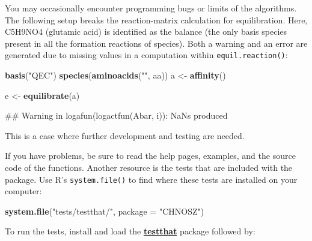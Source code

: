 \documentclass[]{tufte-book}
\newenvironment{Shaded}{}{}
\newcommand{\KeywordTok}[1]{\textcolor[rgb]{0.00,0.44,0.13}{\textbf{#1}}}
\newcommand{\DataTypeTok}[1]{\textcolor[rgb]{0.56,0.13,0.00}{#1}}
\newcommand{\StringTok}[1]{\textcolor[rgb]{0.25,0.44,0.63}{#1}}
\newcommand{\NormalTok}[1]{#1}
\begin{document}
You may occasionally encounter programming bugs or limits of the
algorithms. The following setup breaks the reaction-matrix calculation
for equilibration. Here, C5H9NO4 (glutamic acid) is identified as the
balance (the only basis species present in all the formation reactions
of species). Both a warning and an error are generated due to missing
values in a computation within {\texttt{equil.reaction()}}:

\begin{Shaded}
\begin{Highlighting}[]
\KeywordTok{basis}\NormalTok{(}\StringTok{"QEC"}\NormalTok{)}
\KeywordTok{species}\NormalTok{(}\KeywordTok{aminoacids}\NormalTok{(}\StringTok{""}\NormalTok{, aa))}
\NormalTok{a <-}\StringTok{ }\KeywordTok{affinity}\NormalTok{()}
\end{Highlighting}
\end{Shaded}

\begin{Shaded}
\begin{Highlighting}[]
\NormalTok{e <-}\StringTok{ }\KeywordTok{equilibrate}\NormalTok{(a)}
\end{Highlighting}
\end{Shaded}

\begin{Shaded}
\begin{Highlighting}[]
\NormalTok{## Warning in logafun(logactfun(Abar, i)): NaNs produced}
\end{Highlighting}
\end{Shaded}

This is a case where further development and testing are needed.

If you have problems, be sure to read the help pages, examples, and the
source code of the functions. Another resource is the tests that are
included with the package. Use R's \texttt{system.file()} to find where
these tests are installed on your computer:

\begin{Shaded}
\begin{Highlighting}[]
\KeywordTok{system.file}\NormalTok{(}\StringTok{"tests/testthat/"}\NormalTok{, }\DataTypeTok{package =} \StringTok{"CHNOSZ"}\NormalTok{)}
\end{Highlighting}
\end{Shaded}

To run the tests, install and load the
\href{https://cran.r-project.org/package=testthat}{\textbf{testthat}}
package followed by:
\end{document}
